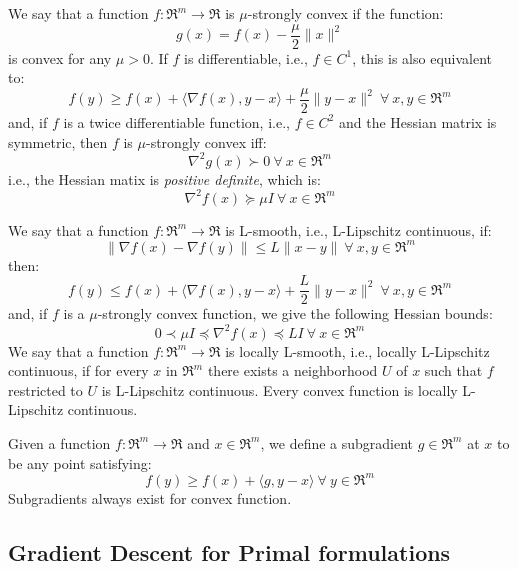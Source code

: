 \begin{definition} \label{def:strong_convexity}
We say that a function $f: \Re^m \rightarrow \Re$ is $\mu$-strongly convex if the function:
$$
g(x) = f(x) - \frac{\mu}{2} \| x \|^2
$$
is convex for any $\mu > 0$. 
If $f$ is differentiable, i.e., $f \in C^1$, this is also equivalent to:
$$
f(y) \geq f(x) + \langle \nabla f(x), y - x \rangle + \frac{\mu}{2} \| y - x \|^2 \ \forall \ x, y \in \Re^m
$$
and, if $f$ is a twice differentiable function, i.e., $f \in C^2$ and the Hessian matrix is symmetric, then $f$ is $\mu$-strongly convex iff:
$$
\nabla^2 g(x) \succ 0 \ \forall \ x \in \Re^m
$$
i.e., the Hessian matix is \emph{positive definite}, which is:
$$
\nabla^2 f(x) \succeq \mu I \ \forall \ x \in \Re^m
$$
\end{definition}

\begin{definition} \label{def:l_lipschitz_continuity}
We say that a function $f: \Re^m \rightarrow \Re$ is L-smooth, i.e., L-Lipschitz continuous, if:
$$
\| \nabla f(x) - \nabla f(y) \| \leq L \| x - y \| \ \forall \ x, y \in \Re^m
$$
then:
$$
f(y) \leq f(x) + \langle \nabla f(x), y - x \rangle + \frac{L}{2} \| y - x \|^2 \ \forall \ x, y \in \Re^m
$$
and, if $f$ is a $\mu$-strongly convex function, we give the following Hessian bounds:
$$
0 \prec \mu I \preceq \nabla^2 f(x) \preceq L I \ \forall \ x \in \Re^m
$$
We say that a function $f: \Re^m \rightarrow \Re$ is locally L-smooth, i.e., locally L-Lipschitz continuous, if for every $x$ in $\Re^m$ there exists a neighborhood $U$ of $x$ such that $f$ restricted to $U$ is L-Lipschitz continuous. Every convex function is locally L-Lipschitz continuous.
\end{definition}

\begin{definition}[Subgradient] \label{def:subgradient}
Given a function $f: \Re^m \rightarrow \Re$ and $x \in \Re^m$, we define a subgradient $g \in \Re^m$ at $x$ to be any point satisfying:
$$
	f(y) \geq f(x) + \langle g, y - x \rangle \ \forall \ y \in \Re^m
$$
Subgradients always exist for convex function.
\end{definition}

\pagebreak

\subsection{Gradient Descent for Primal formulations}

